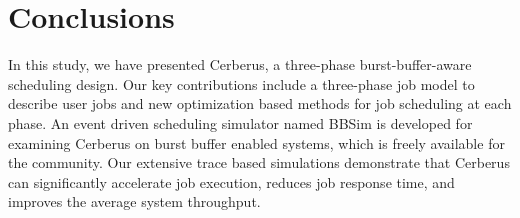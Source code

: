 \section{Conclusions}
\label{Sec:Conclusion}


In this study, we have presented Cerberus, a three-phase burst-buffer-aware scheduling design.
Our key contributions include a three-phase job model to describe user jobs
and new optimization based methods for job scheduling at each phase.
An event driven scheduling simulator named BBSim is developed for examining
Cerberus on burst buffer enabled systems, which is freely available for the community.
Our extensive trace based simulations demonstrate that
Cerberus can significantly accelerate job execution,
reduces job response time, and improves the average system throughput. 
